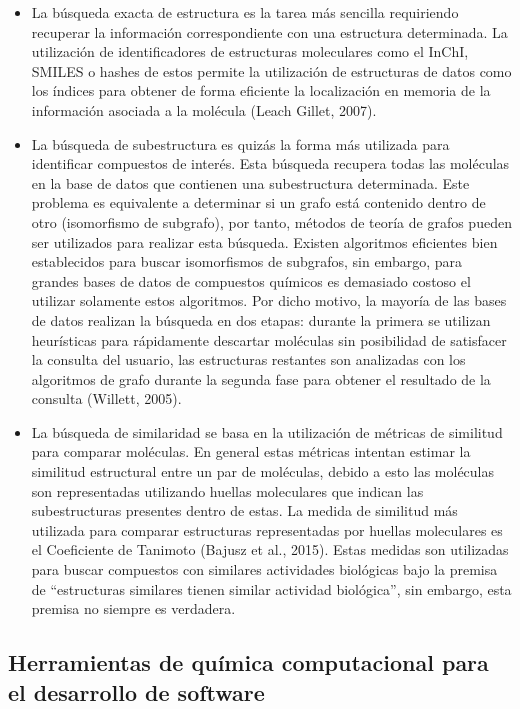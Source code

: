 \begin{itemize}
    \item La búsqueda exacta de estructura es la tarea más sencilla requiriendo recuperar la información correspondiente con una estructura determinada. La utilización de identificadores de estructuras moleculares como el InChI, SMILES o hashes de estos permite la utilización de estructuras de datos como los índices para obtener de forma eficiente la localización en memoria de la información asociada a la molécula (Leach Gillet, 2007). 
    \item La búsqueda de subestructura es quizás la forma más utilizada para identificar compuestos de interés. Esta búsqueda recupera todas las moléculas en la base de datos que contienen una subestructura determinada. Este problema es equivalente a determinar si un grafo está contenido dentro de otro (isomorfismo de subgrafo), por tanto, métodos de teoría de grafos pueden ser utilizados para realizar esta búsqueda. Existen algoritmos eficientes bien establecidos para buscar isomorfismos de subgrafos, sin embargo, para grandes bases de datos de compuestos químicos es demasiado costoso el utilizar solamente estos algoritmos. Por dicho motivo, la mayoría de las bases de datos realizan la búsqueda en dos etapas: durante la primera se utilizan heurísticas para rápidamente descartar moléculas sin posibilidad de satisfacer la consulta del usuario, las estructuras restantes son analizadas con los algoritmos de grafo durante la segunda fase para obtener el resultado de la consulta (Willett, 2005). 
    \item La búsqueda de similaridad se basa en la utilización de métricas de similitud para comparar moléculas. En general estas métricas intentan estimar la similitud estructural entre un par de moléculas, debido a esto las moléculas son representadas utilizando huellas moleculares que indican las subestructuras presentes dentro de estas. La medida de similitud más utilizada para comparar estructuras representadas por huellas moleculares es el Coeficiente de Tanimoto (Bajusz et al., 2015). Estas medidas son utilizadas para buscar compuestos con similares actividades biológicas bajo la premisa de “estructuras similares tienen similar actividad biológica”, sin embargo, esta premisa no siempre es verdadera.
\end{itemize}



\subsection{Herramientas de química computacional para el desarrollo de software}


